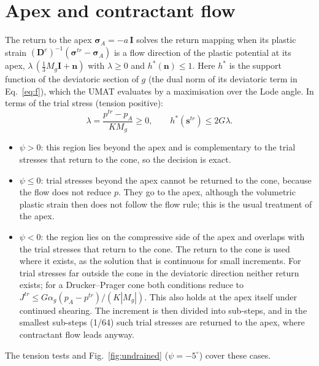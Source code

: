 \documentclass[11pt,a4paper]{article}
\begin{document}
\section{Apex and contractant flow}
\label{sec:apex}

The return to the apex $\boldsymbol{\sigma}_A = -a\,\mathbf{I}$ solves the return mapping when its
plastic strain $(\mathbf{D}^e)^{-1}(\boldsymbol{\sigma}^{tr} - \boldsymbol{\sigma}_A)$ is a flow
direction of the plastic potential at its apex, $\lambda\,(\frac{1}{3}M_g\mathbf{I} + \mathbf{n})$
with $\lambda \ge 0$ and $h^*(\mathbf{n}) \le 1$. Here $h^*$ is the support function of the
deviatoric section of $g$ (the dual norm of its deviatoric term in Eq.~\eqref{eq:f}), which the
UMAT evaluates by a maximisation over the Lode angle. In terms of the trial stress (tension
positive):
\begin{equation}
  \lambda = \frac{p^{tr} - p_A}{K M_g} \ge 0, \qquad h^*(\mathbf{s}^{tr}) \le 2G\lambda.
\end{equation}
\begin{itemize}
  \item $\psi > 0$: this region lies beyond the apex and is complementary to the trial stresses
        that return to the cone, so the decision is exact.
  \item $\psi \le 0$: trial stresses beyond the apex cannot be returned to the cone, because the
        flow does not reduce $p$. They go to the apex, although the volumetric plastic strain then
        does not follow the flow rule; this is the usual treatment of the apex.
  \item $\psi < 0$: the region lies on the compressive side of the apex and overlaps with the
        trial stresses that return to the cone. The return to the cone is used where it exists,
        as the solution that is continuous for small increments. For trial stresses far outside
        the cone in the deviatoric direction neither return exists; for a Drucker--Prager cone
        both conditions reduce to $J^{tr} \le G\alpha_g(p_A - p^{tr})/(K|M_g|)$. This also holds at
        the apex itself under continued shearing. The increment is then divided into sub-steps,
        and in the smallest sub-steps (1/64) such trial stresses are returned to the apex, where
        contractant flow leads anyway.
\end{itemize}
The tension tests and Fig.~\ref{fig:undrained} ($\psi = -5^\circ$) cover these cases.
\end{document}
